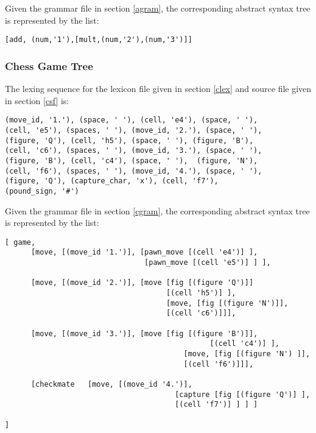 \documentclass[a4paper,10pt]{article}
\def\st{\noindent}
\begin{document}
Given the grammar file in section \ref{agram}, the corresponding abstract syntax tree is represented by the list:
\begin{verbatim}
[add, (num,'1'),[mult,(num,'2'),(num,'3')]]
\end{verbatim}
\subsubsection{Chess Game Tree}

The lexing sequence for the  lexicon file given in section \ref{clex} and source file given in section \ref{csf} is:

\begin{verbatim}
(move_id, '1.'), (space, ' '), (cell, 'e4'), (space, ' '), 
(cell, 'e5'), (spaces, ' '), (move_id, '2.'), (space, ' '), 
(figure, 'Q'), (cell, 'h5'), (space, ' '), (figure, 'B'),
(cell, 'c6'), (spaces, ' '), (move_id, '3.'), (space, ' '), 
(figure, 'B'), (cell, 'c4'), (space, ' '),  (figure, 'N'), 
(cell, 'f6'), (spaces, ' '), (move_id, '4.'), (space, ' '), 
(figure, 'Q'), (capture_char, 'x'), (cell, 'f7'),  
(pound_sign, '#')
\end{verbatim} 

\st
Given the grammar file in section \ref{cgram}, the corresponding abstract syntax tree  is represented by the list:

\begin{verbatim}
[ game,
      [move, [(move_id '1.')], [pawn_move [(cell 'e4')] ], 
                                [pawn_move [(cell 'e5')] ] ],
       
      [move, [(move_id '2.')], [move [fig [(figure 'Q')]] 
                                     [(cell 'h5')] ], 
                                     [move, [fig [(figure 'N')]], 
                                     [(cell 'c6')]]],
           
      [move, [(move_id '3.')], [move [fig [(figure 'B')]],
                                               [(cell 'c4')] ], 
                                         [move, [fig [(figure 'N') ]], 
                                         [(cell 'f6')]]],
               
      [checkmate   [move, [(move_id '4.')],
                                       [capture [fig [(figure 'Q')] ], 
                                       [(cell 'f7')] ] ] ]
               
]
\end{verbatim}



   


\end{document}
